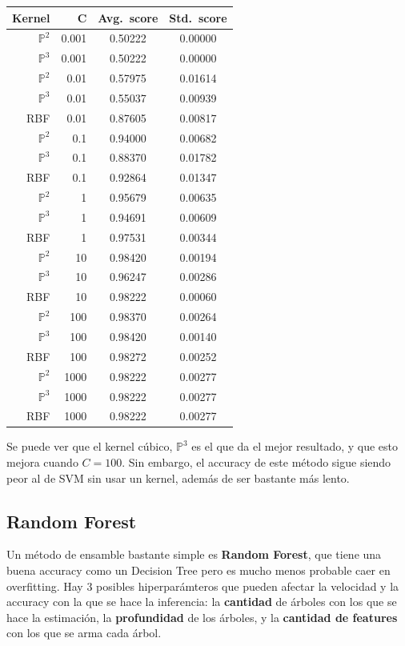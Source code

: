 \documentclass{article}
\begin{document}
\begin{center}
\begin{tabular}{r r c c}
	\toprule
	\textbf{Kernel} & \textbf{C} & \textbf{Avg.\ score} & \textbf{Std.\ score} \\
	\midrule
	\(\mathbb{P}^2\) & 0.001 & 0.50222 & 0.00000 \\
	\(\mathbb{P}^3\) & 0.001 & 0.50222 & 0.00000 \\
	\(\mathbb{P}^2\) & 0.01 & 0.57975 & 0.01614 \\
	\(\mathbb{P}^3\) & 0.01 & 0.55037 & 0.00939 \\
	RBF & 0.01 & 0.87605 & 0.00817 \\
	\(\mathbb{P}^2\) & 0.1 & 0.94000 & 0.00682 \\
	\(\mathbb{P}^3\) & 0.1 & 0.88370 & 0.01782 \\
	RBF & 0.1 & 0.92864 & 0.01347 \\
	\(\mathbb{P}^2\) & 1 & 0.95679 & 0.00635 \\
	\(\mathbb{P}^3\) & 1 & 0.94691 & 0.00609 \\
	RBF & 1 & 0.97531 & 0.00344 \\
	\(\mathbb{P}^2\) & 10 & 0.98420 & 0.00194 \\
	\(\mathbb{P}^3\) & 10 & 0.96247 & 0.00286 \\
	RBF & 10 & 0.98222 & 0.00060 \\
	\(\mathbb{P}^2\) & 100 & 0.98370 & 0.00264 \\
	\(\mathbb{P}^3\) & 100 & 0.98420 & 0.00140 \\
	RBF & 100 & 0.98272 & 0.00252 \\
	\(\mathbb{P}^2\) & 1000 & 0.98222 & 0.00277 \\
	\(\mathbb{P}^3\) & 1000 & 0.98222 & 0.00277 \\
	RBF & 1000 & 0.98222 & 0.00277 \\
	\bottomrule
\end{tabular}
\end{center}

Se puede ver que el kernel cúbico, \(\mathbb{P}^3\) es el que da el mejor resultado, y que esto mejora cuando \( C = 100\). Sin embargo, el accuracy de este método sigue siendo peor al de SVM sin usar un kernel, además de ser bastante más lento.

\subsection{Random Forest}

Un método de ensamble bastante simple es \textbf{Random Forest}, que tiene una buena accuracy como un Decision Tree pero es mucho menos probable caer en overfitting. Hay 3 posibles hiperparámteros que pueden afectar la velocidad y la accuracy con la que se hace la inferencia: la \textbf{cantidad} de árboles con los que se hace la estimación, la \textbf{profundidad} de los árboles, y la \textbf{cantidad de features} con los que se arma cada árbol.
\end{document}
